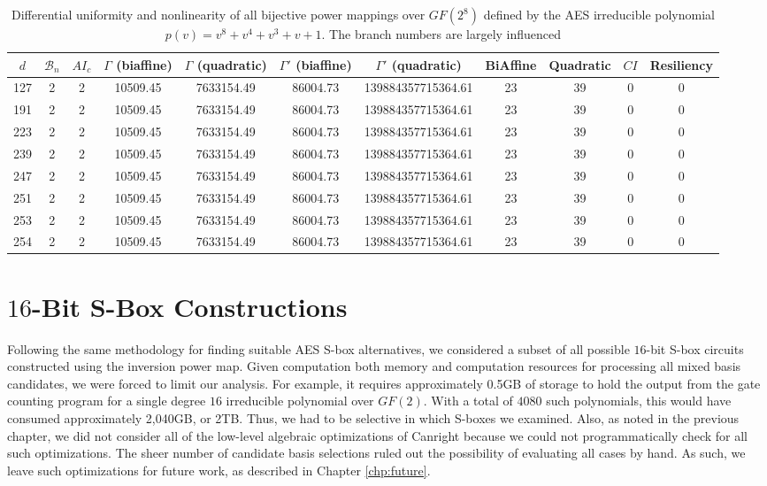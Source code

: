 \begin{table}
\begin{center}
\caption{Differential uniformity and nonlinearity of all bijective power mappings over $GF(2^8)$ defined by the AES irreducible polynomial $p(v) = v^8 + v^4 + v^3 + v + 1$. The branch numbers are largely influenced }
\label{tab:gf28selectMapStrength}
    \begin{tabular}{|c|c|c|c|c|c|c|c|c|c|c|} \hline
    $d$ & $\mathcal{B}_n$ & $AI_c$ & $\Gamma$ (biaffine) & $\Gamma$ (quadratic) & $\Gamma'$ (biaffine) & $\Gamma'$ (quadratic) & BiAffine & Quadratic & $CI$ & Resiliency \\ \hline
    127 & 2 & 2 & 10509.45 & 7633154.49 & 86004.73 & 139884357715364.61 & 23 & 39 & 0 & 0 \\ 
    191 & 2 & 2 & 10509.45 & 7633154.49 & 86004.73 & 139884357715364.61 & 23 & 39 & 0 & 0 \\ 
    223 & 2 & 2 & 10509.45 & 7633154.49 & 86004.73 & 139884357715364.61 & 23 & 39 & 0 & 0 \\ 
    239 & 2 & 2 & 10509.45 & 7633154.49 & 86004.73 & 139884357715364.61 & 23 & 39 & 0 & 0 \\ 
    247 & 2 & 2 & 10509.45 & 7633154.49 & 86004.73 & 139884357715364.61 & 23 & 39 & 0 & 0 \\ 
    251 & 2 & 2 & 10509.45 & 7633154.49 & 86004.73 & 139884357715364.61 & 23 & 39 & 0 & 0 \\ 
    253 & 2 & 2 & 10509.45 & 7633154.49 & 86004.73 & 139884357715364.61 & 23 & 39 & 0 & 0 \\ 
    254 & 2 & 2 & 10509.45 & 7633154.49 & 86004.73 & 139884357715364.61 & 23 & 39 & 0 & 0 \\ \hline
    \end{tabular}
\end{center}
\end{table}

\section{$16$-Bit S-Box Constructions}
Following the same methodology for finding suitable AES S-box alternatives, we considered a subset of all possible $16$-bit S-box circuits constructed using the inversion power map. Given computation both memory and computation resources for processing all mixed basis candidates, we were forced to limit our analysis. For example, it requires approximately 0.5GB of storage to hold the output from the gate counting program for a single degree $16$ irreducible polynomial over $GF(2)$. With a total of $4080$ such polynomials, this would have consumed approximately 2,040GB, or 2TB. Thus, we had to be selective in which S-boxes we examined. Also, as noted in the previous chapter, we did not consider all of the low-level algebraic optimizations of Canright because we could not programmatically check for all such optimizations. The sheer number of candidate basis selections ruled out the possibility of evaluating all cases by hand. As such, we leave such optimizations for future work, as described in Chapter \ref{chp:future}. 

